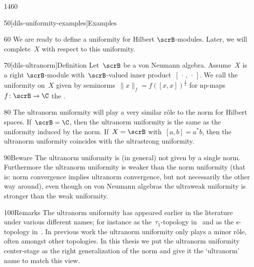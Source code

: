 \begin{parsec}{1460}
\begin{point}{50}[dils-uniformity-examples]{Examples}
\begin{enumerate}
    \end{enumerate}
    \spacingfix{}
\begin{point}{60}%
We are ready to define a uniformity for Hilbert $\scrB$-modules.
Later, we will complete~$X$ with respect to this uniformity.
\end{point}
\end{point}
\begin{point}{70}[dils-ultranorm]{Definition}%
Let~$\scrB$ be a von Neumann algebra.
Assume~$X$ is a right $\scrB$-module
    with~$\scrB$-valued inner product~$[\,\cdot\,,\,\cdot\,]$.
We call the uniformity on~$X$
    given by seminorms~$\|x\|_f = f([x,x])^{\frac{1}{2}}$
    for np-maps~$f\colon \scrB \to \C$
    the .
\begin{point}{80}%
The ultranorm uniformity will play a very similar r\^ole
    to the norm for Hilbert spaces.
If~$\scrB=\C$, then the ultranorm uniformity is
    the same as the uniformity induced by the norm.
If~$X=\scrB$ with~$[a,b]=a^*b$,
    then the ultranorm uniformity coincides with the ultrastrong uniformity.
\end{point}
\begin{point}{90}{Beware}%
    The ultranorm uniformity is (in general) not given by a single norm.
    Furthermore the ultranorm uniformity is weaker than the norm uniformity
        (that is: norm convergence implies ultranorm convergence,
            but not necessarily the other way around),
        even though on von Neumann algebras the
        ultraweak uniformity
        is stronger than the weak uniformity.
\end{point}
\begin{point}{100}{Remarks}%
The ultranorm uniformity has appeared earlier in the literature
    under various different names; for instance as the~$\tau_1$-topology
    in~\cite[thm.~3.5.1]{manuilov2000hilbertc} and as the s-topology
    in~\cite[2.9]{ghez1985w}.
In previous work the ultranorm uniformity only plays a minor r\^ole,
    often amongst other topologies.
In this thesis we put the ultranorm uniformity center-stage
    as the right generalization of the norm
    and give it the `ultranorm' name to match this view.
\end{point}
\end{point}
\end{parsec}

